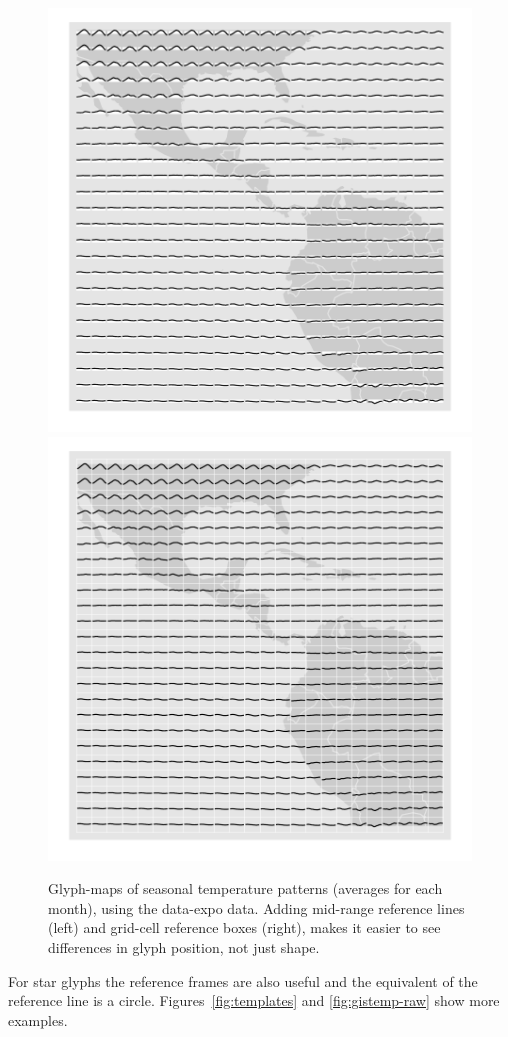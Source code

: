 \documentclass[oneside]{article}
\begin{document}


\begin{figure}[htbp]
  \centering
  \includegraphics[width=0.5\linewidth]{ref-line}%
  \includegraphics[width=0.5\linewidth]{ref-box}

  \caption{Glyph-maps of seasonal temperature patterns (averages for each month), using the data-expo data. Adding mid-range reference lines (left) and grid-cell reference boxes (right), makes it easier to see differences in glyph position, not just shape.}
  \label{fig:ref-basic}
\end{figure}

For star glyphs the reference frames are also useful and the equivalent of the reference line is a circle. Figures~\ref{fig:templates} and \ref{fig:gistemp-raw} show more examples.
\end{document}
